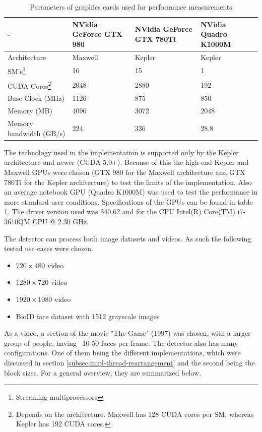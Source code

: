 \begin{center}
\begin{table}[htbp]
\begin{tabularx}{\textwidth}{| X | X | X | X |}
\hline
- & NVidia GeForce GTX 980 & NVidia GeForce GTX 780Ti & NVidia Quadro K1000M \\
\hline
Architecture & Maxwell & Kepler & Kepler \\
\hline
SM's\footnote{Streaming multiprocessors} & 16 & 15 & 1 \\
\hline
CUDA Cores\footnote{Depends on the architecture. Maxwell has 128 CUDA cores per SM, whereas Kepler has 192 CUDA cores.} & 2048 & 2880 & 192 \\
\hline
Base Clock (MHz) & 1126 & 875 & 850 \\
\hline
Memory (MB) & 4096 & 3072 & 2048 \\
\hline
Memory bandwidth (GB/s) & 224 & 336 & 28.8 \\
\hline
\end{tabularx}
\caption{Parameters of graphics cards used for performance measurements}
\label{tab:parameters-gpu}
\end{table}
\end{center}

The technology used in the implementation is supported only by the Kepler architecture and newer (CUDA 5.0+). Because of this the high-end Kepler and Maxwell GPUs were chosen (GTX 980 for the Maxwell architecture and GTX 780Ti for the Kepler architecture) to test the limits of the implementation. Also an average notebook GPU (Quadro K1000M) was used to test the performance in more standard user conditions. Specifications of the GPUs can be found in table \ref{tab:parameters-gpu}. The driver version used was 340.62 and for the CPU Intel(R) Core(TM) i7-3610QM CPU @ 2.30 GHz.

The detector can process both image datasets and videos. As such the following tested use cases were chosen.

\begin{itemize}
	\item $720 \times 480$ video
	\item $1280 \times 720$ video
	\item $1920 \times 1080$ video
	\item BioID face dataset with 1512 grayscale images
\end{itemize}

As a video, a section of the movie "The Game" (1997) was chosen, with a larger group of people, having ~10-50 faces per frame. The detector also has many configurations. One of them being the different implementations, which were discussed in section \ref{subsec:impl-thread-rearrangement} and the second being the block sizes. For a general overview, they are summarized below.

